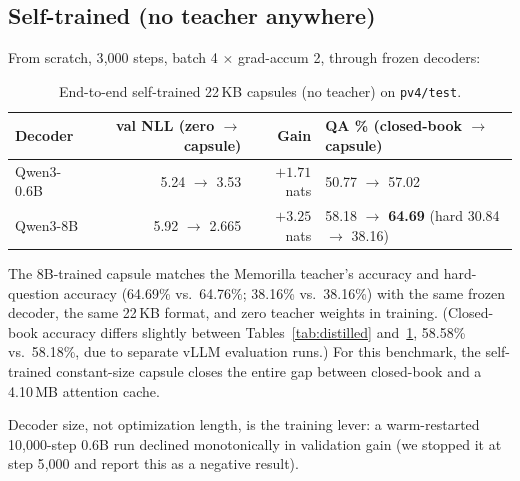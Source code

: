 \documentclass[11pt]{article}
\begin{document}
\subsection{Self-trained (no teacher anywhere)}
From scratch, 3{,}000 steps, batch 4 $\times$ grad-accum 2, through
frozen decoders:
\begin{table}[ht]
\centering
\caption{End-to-end self-trained 22\,KB capsules (no teacher) on \texttt{pv4/test}.}
\label{tab:e2e}
\begin{tabular}{lrrl}
\toprule
Decoder & val NLL (zero $\to$ capsule) & Gain & QA \% (closed-book $\to$ capsule)\\
\midrule
Qwen3-0.6B & 5.24 $\to$ 3.53 & $+1.71$ nats & 50.77 $\to$ 57.02\\
Qwen3-8B & 5.92 $\to$ 2.665 & $+3.25$ nats & 58.18 $\to$ \textbf{64.69} (hard 30.84 $\to$ 38.16)\\
\bottomrule
\end{tabular}
\end{table}
The 8B-trained capsule matches the Memorilla teacher's accuracy and
hard-question accuracy (64.69\% vs.\ 64.76\%; 38.16\% vs.\ 38.16\%)
with the same frozen decoder, the same 22\,KB format, and zero teacher
weights in training. (Closed-book accuracy differs slightly between
Tables~\ref{tab:distilled} and~\ref{tab:e2e}, 58.58\% vs.\ 58.18\%, due
to separate vLLM evaluation runs.) For this benchmark, the self-trained
constant-size capsule closes the entire gap between closed-book and a
4.10\,MB attention cache.

Decoder size, not optimization length, is the training lever: a
warm-restarted 10{,}000-step 0.6B run declined monotonically in
validation gain (we stopped it at step 5{,}000 and report this as a
negative result).
\end{document}
